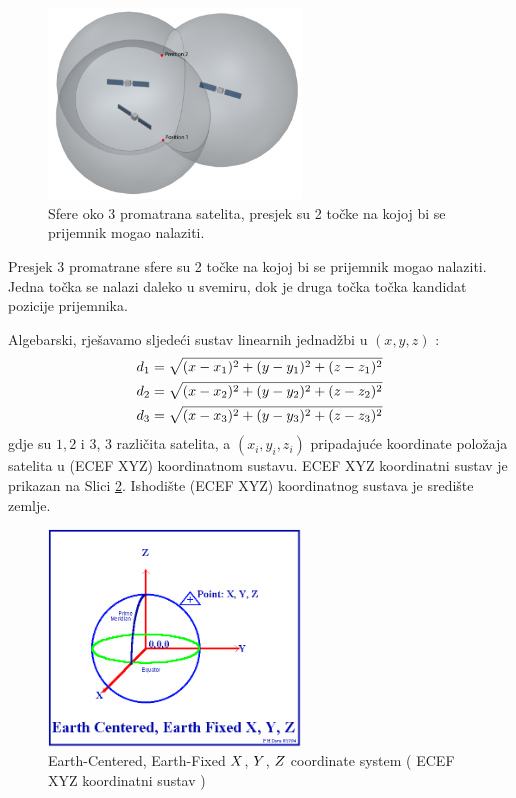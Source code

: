 \documentclass[a4paper,twoside,12pt]{memoir} %
\begin{document}
	\begin{figure}[H]
		\centering
		\includegraphics[width=0.6\textwidth]{satellites_distance_33D}
		\caption{Sfere oko 3 promatrana satelita, presjek su 2 točke na kojoj bi se prijemnik mogao nalaziti. \cite{gps:2}}
		\label{Fig:3SatelitePosition}
	\end{figure}
	
	Presjek 3 promatrane sfere su 2 točke na kojoj bi se prijemnik mogao nalaziti.
	Jedna točka se nalazi daleko u svemiru, dok je druga točka točka kandidat pozicije prijemnika. 
	
	Algebarski, rješavamo sljedeći sustav linearnih jednadžbi u $(x,y,z)$ :
	\begin{align}\label{eq:position2}
	 d_1 = \sqrt{(x-x_1)^{2}+(y-y_1)^{2}+(z-z_1)^{2}} \notag \\
	 d_2 = \sqrt{(x-x_2)^{2}+(y-y_2)^{2}+(z-z_2)^{2}} \\
	 d_3 = \sqrt{(x-x_3)^{2}+(y-y_3)^{2}+(z-z_3)^{2}} \notag
	\end{align}
	gdje su $1,2 \text{ i }3$,  3 različita satelita, a $(x_i,y_i,z_i)$ pripadajuće
	koordinate položaja satelita u (ECEF XYZ) koordinatnom sustavu.
	ECEF XYZ koordinatni sustav je prikazan na Slici \ref{Fig:na}. Ishodište (ECEF XYZ) koordinatnog sustava je središte zemlje.
	
	\begin{figure}[H]
		\centering
		\includegraphics[width=0.6\textwidth]{ecefxyz.png}
		\caption{Earth-Centered, Earth-Fixed $\mathnormal{X}$, $\mathnormal{Y}$, $\mathnormal{Z}$ coordinate system ( ECEF XYZ koordinatni sustav ) \cite{GPS:overview}}
		\label{Fig:na}
	\end{figure}
	
\end{document}
